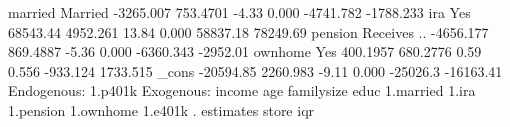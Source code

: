              {\VBAR}
     married {\VBAR}
    Married  {\VBAR}  -3265.007   753.4701    -4.33   0.000    -4741.782   -1788.233
             {\VBAR}
         ira {\VBAR}
        Yes  {\VBAR}   68543.44   4952.261    13.84   0.000     58837.18    78249.69
             {\VBAR}
     pension {\VBAR}
Receives ..  {\VBAR}  -4656.177   869.4887    -5.36   0.000    -6360.343    -2952.01
             {\VBAR}
     ownhome {\VBAR}
        Yes  {\VBAR}   400.1957   680.2776     0.59   0.556     -933.124    1733.515
       _cons {\VBAR}  -20594.85   2260.983    -9.11   0.000     -25026.3   -16163.41
Endogenous: 1.p401k
Exogenous:  income age familysize educ 1.married 1.ira 1.pension 1.ownhome
            1.e401k
{\smallskip}
. estimates  store iqr
